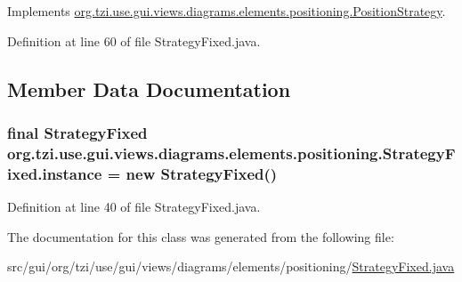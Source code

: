 Implements \hyperlink{interfaceorg_1_1tzi_1_1use_1_1gui_1_1views_1_1diagrams_1_1elements_1_1positioning_1_1_position_strategy_aeefc92690d78ec3452c109f53cb36d8a}{org.\-tzi.\-use.\-gui.\-views.\-diagrams.\-elements.\-positioning.\-Position\-Strategy}.



Definition at line 60 of file Strategy\-Fixed.\-java.



\subsection{Member Data Documentation}
\hypertarget{classorg_1_1tzi_1_1use_1_1gui_1_1views_1_1diagrams_1_1elements_1_1positioning_1_1_strategy_fixed_a973a1566cc43e33e560f48fab1a9cf42}{
\subsubsection[{instance}]{\setlength{\rightskip}{0pt plus 5cm}final {\bf Strategy\-Fixed} org.\-tzi.\-use.\-gui.\-views.\-diagrams.\-elements.\-positioning.\-Strategy\-Fixed.\-instance = new {\bf Strategy\-Fixed}()\hspace{0.3cm}{\ttfamily [static]}}}\label{classorg_1_1tzi_1_1use_1_1gui_1_1views_1_1diagrams_1_1elements_1_1positioning_1_1_strategy_fixed_a973a1566cc43e33e560f48fab1a9cf42}


Definition at line 40 of file Strategy\-Fixed.\-java.



The documentation for this class was generated from the following file\-:\begin{DoxyCompactItemize}
\item 
src/gui/org/tzi/use/gui/views/diagrams/elements/positioning/\hyperlink{_strategy_fixed_8java}{Strategy\-Fixed.\-java}\end{DoxyCompactItemize}
